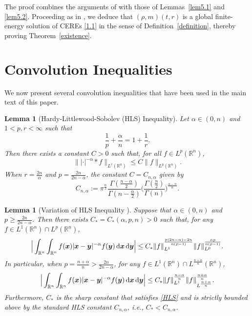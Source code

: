 \documentclass[reqno,11pt]{amsart}
\numberwithin{equation}{section}
\newtheorem{lemma}[theorem]{Lemma}
\theoremstyle{definition}
\def\dd{{\, \rm d}}
\begin{document}
The proof combines the arguments of \cite[\S 9]{Chen_2024} with those of Lemmas~\ref{lem5.1} and \ref{lem5.2}. Proceeding as in \cite[\S 5]{Chen2021}, we deduce that $(\rho,m)(t,r)$ is a global finite-energy solution 
of CEREs \eqref{1.1} in the sense of Definition~\ref{definition}, 
thereby proving Theorem~\ref{existence}.

\appendix

\section{Convolution Inequalities}
We now present several convolution inequalities that have been used in the main text of this paper.

\begin{lemma}[Hardy-Littlewood-Sobolev (HLS) Inequality]\label{simplehls}
	Let $\alpha \in (0,n)$ and $1 < p,r < \infty$ such that
	\[
	\frac{1}{p} + \frac{\alpha}{n} = 1 + \frac{1}{r}.
	\]
Then there exists a constant $C>0$ such that,
    for all $f \in L^p(\mathbb{R}^n)$,
	\begin{equation*}
	\big\| |\cdot |^{-\alpha} * f \big\|_{L^r(\mathbb{R}^n)} \leq C\|f\|_{L^p(\mathbb{R}^n)}.
	\end{equation*}    
    When $r = \frac{2n}{\alpha}$ and $p=\frac{2n}{2n-\alpha}$, the constant $C=C_{n,\alpha}$ given by
    \[
    C_{n,\alpha} := \pi^\frac{\alpha}{2} \frac{\Gamma(\frac{n - \alpha}{2})}{\Gamma( n - \frac{\alpha}{2})} 
    \bigg( \frac{\Gamma(\frac{n}{2})}{\Gamma(n)} \bigg)^{\frac{\alpha - n}{n}}.
    \]
\end{lemma}

\begin{lemma}[Variation of HLS Inequality ]\label{HLSineq}
Suppose that $\alpha \in (0,n)$ and $p \geq \frac{2n}{2n - \alpha}$.
Then there exists $C_* = C_*(\alpha,p,n) > 0$ such that, for any $f \in L^1(\mathbb{R}^n) \cap L^p(\mathbb{R}^n)$,
\begin{equation}\label{HLS}
\Big| \int_{\mathbb{R}^n} \int_{\mathbb{R}^n} f(\boldsymbol{x}) |\boldsymbol{x} - \boldsymbol{y}|^{-\alpha} f(\boldsymbol{y}) \dd \boldsymbol{x} \dd \boldsymbol{y} \Big| 
\leq C_* \| f \|_{L^1}^\frac{p (2n - \alpha) - 2n}{n(p - 1)} \| f \|_{L^p}^\frac{\alpha p}{n(p - 1)}.
\end{equation}
In particular, when $p = \frac{n + \alpha}{n} > \frac{2n}{2n - \alpha}$, for any
$f \in L^1(\mathbb{R}^n) \cap L^{\frac{n + \alpha}{n}}(\mathbb{R}^n)$,
\[
\Big| \int_{\mathbb{R}^n} \int_{\mathbb{R}^n} f(\boldsymbol{x}) |\boldsymbol{x} - \boldsymbol{y}|^{-\alpha} f(\boldsymbol{y}) \dd \boldsymbol{x} \dd \boldsymbol{y} \Big|
\leq C_* \| f \|_{L^1}^\frac{n - \alpha}{n} \| f \|_{L^{\frac{n + \alpha}{n}}}^\frac{n + \alpha}{n}.
\]
Furthermore, $C_*$ is the sharp constant that satisfies \eqref{HLS} and is strictly bounded above by the standard HLS constant $C_{n,\alpha}$, i.e., $C_* < C_{n,\alpha}$.
\end{lemma}
\end{document}
